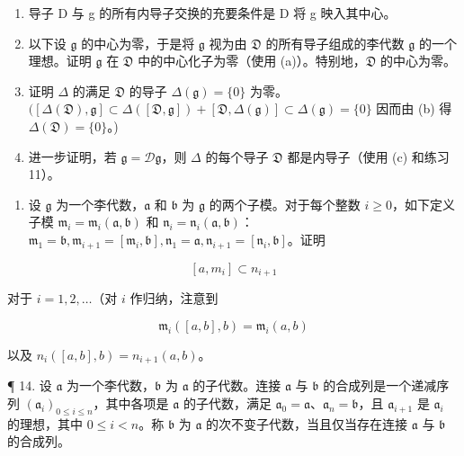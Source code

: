 \begin{enumerate}
\def\labelenumi{(\alph{enumi})}
\item
  导子 D 与 g 的所有内导子交换的充要条件是 D 将 g 映入其中心。
\item
  以下设 \(\mathfrak{g}\) 的中心为零，于是将 \(\mathfrak{g}\) 视为由 \(\mathfrak{D}\) 的所有导子组成的李代数 \(\mathfrak{g}\) 的一个理想。证明 \(\mathfrak{g}\) 在 \(\mathfrak{D}\) 中的中心化子为零（使用 (a)）。特别地，\(\mathfrak{D}\) 的中心为零。
\item
  证明 \(\Delta\) 的满足 \(\mathfrak{D}\) 的导子 \(\Delta(\mathfrak{g}) = \{0\}\) 为零。 \(([\Delta(\mathfrak{D}),\mathfrak{g}]\subset \Delta([\mathfrak{D},\mathfrak{g}]) + [\mathfrak{D},\Delta(\mathfrak{g})]\subset \Delta(\mathfrak{g}) = \{0\}\) 因而由 (b) 得 \(\Delta(\mathfrak{D}) = \{0\}\)。)
\item
  进一步证明，若 \(\mathfrak{g} = \mathcal{D}\mathfrak{g}\)，则 \(\Delta\) 的每个导子 \(\mathfrak{D}\) 都是内导子（使用 (c) 和练习 11）。
\end{enumerate}

\begin{enumerate}
\def\labelenumi{\arabic{enumi}.}
\setcounter{enumi}{12}
\tightlist
\item
  设 \(\mathfrak{g}\) 为一个李代数，\(\mathfrak{a}\) 和 \(\mathfrak{b}\) 为 \(\mathfrak{g}\) 的两个子模。对于每个整数 \(i \geqslant 0\)，如下定义子模 \(\mathfrak{m}_i = \mathfrak{m}_i(\mathfrak{a},\mathfrak{b})\) 和 \(\mathfrak{n}_i = \mathfrak{n}_i(\mathfrak{a},\mathfrak{b})\)：\(\mathfrak{m}_1 = \mathfrak{b}, \mathfrak{m}_{i+1} = [\mathfrak{m}_i,\mathfrak{b}], \mathfrak{n}_1 = \mathfrak{a}, \mathfrak{n}_{i+1} = [\mathfrak{n}_i,\mathfrak{b}]\)。证明
\end{enumerate}

\[
[ a, m _ {i} ] \subset n _ {i + 1}
\]

对于 \(i = 1,2,\ldots\)（对 \(i\) 作归纳，注意到

\[
\mathfrak {m} _ {i} ([ a, b ], b) = \mathfrak {m} _ {i} (a, b)
\]

以及 \(n_{i}([a,b],b)=n_{i+1}(a,b)\)。

¶ 14. 设 \(\mathfrak{a}\) 为一个李代数，\(\mathfrak{b}\) 为 \(\mathfrak{a}\) 的子代数。连接 \(\mathfrak{a}\) 与 \(\mathfrak{b}\) 的合成列是一个递减序列 \((\mathfrak{a}_i)_{0\leqslant i\leqslant n}\)，其中各项是 \(\mathfrak{a}\) 的子代数，满足 \(\mathfrak{a}_0 = \mathfrak{a}\)、\(\mathfrak{a}_n = \mathfrak{b}\)，且 \(\mathfrak{a}_{i+1}\) 是 \(\mathfrak{a}_i\) 的理想，其中 \(0\leqslant i < n\)。称 \(\mathfrak{b}\) 为 \(\mathfrak{a}\) 的次不变子代数，当且仅当存在连接 \(\mathfrak{a}\) 与 \(\mathfrak{b}\) 的合成列。


